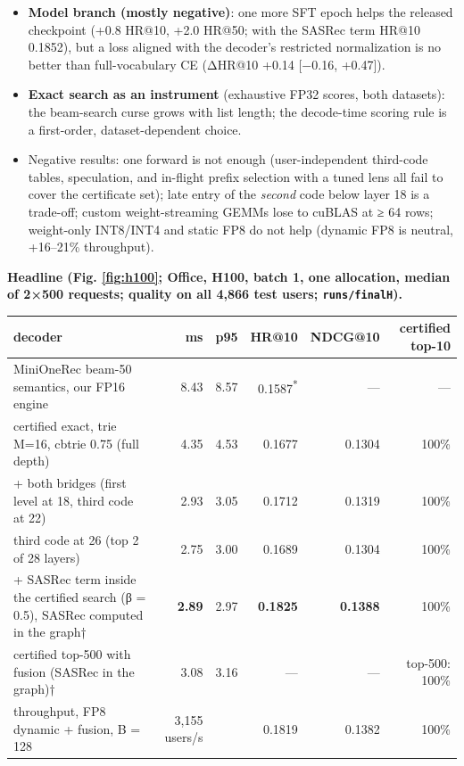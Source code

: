 \documentclass[11pt]{article}
\newcommand{\code}[1]{\texttt{#1}}
\begin{document}
\begin{itemize}
\item \textbf{Model branch (mostly negative)}: one more SFT epoch helps the released checkpoint (+0.8 HR@10, +2.0 HR@50; with the SASRec term HR@10 0.1852), but a loss aligned with the decoder's restricted normalization is no better than full-vocabulary CE (ΔHR@10 +0.14 [−0.16, +0.47]).
\item \textbf{Exact search as an instrument} (exhaustive FP32 scores, both datasets): the beam-search curse grows with list length; the decode-time scoring rule is a first-order, dataset-dependent choice.
\item Negative results: one forward is not enough (user-independent third-code tables, speculation, and in-flight prefix selection with a tuned lens all fail to cover the certificate set); late entry of the \emph{second} code below layer 18 is a trade-off; custom weight-streaming GEMMs lose to cuBLAS at ≥ 64 rows; weight-only INT8/INT4 and static FP8 do not help (dynamic FP8 is neutral, +16–21\% throughput).
\end{itemize}

\textbf{Headline (Fig. \ref{fig:h100}; Office, H100, batch 1, one allocation, median of 2×500 requests; quality on all 4,866 test users; \code{runs/\allowbreak{}finalH}).}

{\small
\setlength{\tabcolsep}{4pt}
\begin{xltabular}{\linewidth}{>{\raggedright\arraybackslash{}\hsize}Xrrrrr}
\toprule
decoder & ms & p95 & HR@10 & NDCG@10 & certified top-10 \\
\midrule
\endhead
MiniOneRec beam-50 semantics, our FP16 engine & 8.43 & 8.57 & 0.1587\textsuperscript{*} & — & — \\
certified exact, trie M=16, cbtrie 0.75 (full depth) & 4.35 & 4.53 & 0.1677 & 0.1304 & 100\% \\
+ both bridges (first level at 18, third code at 22) & 2.93 & 3.05 & 0.1712 & 0.1319 & 100\% \\
third code at 26 (top 2 of 28 layers) & 2.75 & 3.00 & 0.1689 & 0.1304 & 100\% \\
+ SASRec term inside the certified search (β = 0.5), SASRec computed in the graph† & \textbf{2.89} & 2.97 & \textbf{0.1825} & \textbf{0.1388} & 100\% \\
certified top-500 with fusion (SASRec in the graph)† & 3.08 & 3.16 & — & — & top-500: 100\% \\
throughput, FP8 dynamic + fusion, B = 128 & 3,155 users/s &  & 0.1819 & 0.1382 & 100\% \\
\bottomrule
\end{xltabular}
}
\end{document}
